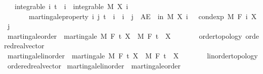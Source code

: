 \begin{isabellebody}
\ \ \ integrable{\isacharcolon}{\kern0pt}\ {\isachardoublequoteopen}{\isasymAnd}i{\isachardot}{\kern0pt}\ t\ {\isasymle}\ i\ {\isasymLongrightarrow}\ integrable\ M\ {\isacharparenleft}{\kern0pt}X\ i{\isacharparenright}{\kern0pt}{\isachardoublequoteclose}\isanewline
\ \ \ \ \ \ \ martingale{\isacharunderscore}{\kern0pt}property{\isacharcolon}{\kern0pt}\ {\isachardoublequoteopen}{\isasymAnd}i\ j{\isachardot}{\kern0pt}\ t\ {\isasymle}\ i\ {\isasymLongrightarrow}\ i\ {\isasymle}\ j\ {\isasymLongrightarrow}\ AE\ {\isasymxi}\ in\ M{\isachardot}{\kern0pt}\ X\ i\ {\isasymxi}\ {\isacharequal}{\kern0pt}\ cond{\isacharunderscore}{\kern0pt}exp\ M\ {\isacharparenleft}{\kern0pt}F\ i{\isacharparenright}{\kern0pt}\ {\isacharparenleft}{\kern0pt}X\ j{\isacharparenright}{\kern0pt}\ {\isasymxi}{\isachardoublequoteclose}\isanewline
\isanewline
{}\isamarkupfalse%
\ martingale{\isacharunderscore}{\kern0pt}order\ {\isacharequal}{\kern0pt}\ martingale\ M\ F\ t\ X\ \ M\ F\ t\ \ X\ {\isacharcolon}{\kern0pt}{\isacharcolon}{\kern0pt}\ {\isachardoublequoteopen}{\isacharunderscore}{\kern0pt}\ {\isasymRightarrow}\ {\isacharunderscore}{\kern0pt}\ {\isasymRightarrow}\ {\isacharunderscore}{\kern0pt}\ {\isacharcolon}{\kern0pt}{\isacharcolon}{\kern0pt}\ {\isacharbraceleft}{\kern0pt}order{\isacharunderscore}{\kern0pt}topology{\isacharcomma}{\kern0pt}\ ordered{\isacharunderscore}{\kern0pt}real{\isacharunderscore}{\kern0pt}vector{\isacharbraceright}{\kern0pt}{\isachardoublequoteclose}\isanewline
{}\isamarkupfalse%
\ martingale{\isacharunderscore}{\kern0pt}linorder\ {\isacharequal}{\kern0pt}\ martingale\ M\ F\ t\ X\ \ M\ F\ t\ \ X\ {\isacharcolon}{\kern0pt}{\isacharcolon}{\kern0pt}\ {\isachardoublequoteopen}{\isacharunderscore}{\kern0pt}\ {\isasymRightarrow}\ {\isacharunderscore}{\kern0pt}\ {\isasymRightarrow}\ {\isacharunderscore}{\kern0pt}\ {\isacharcolon}{\kern0pt}{\isacharcolon}{\kern0pt}\ {\isacharbraceleft}{\kern0pt}linorder{\isacharunderscore}{\kern0pt}topology{\isacharcomma}{\kern0pt}\ ordered{\isacharunderscore}{\kern0pt}real{\isacharunderscore}{\kern0pt}vector{\isacharbraceright}{\kern0pt}{\isachardoublequoteclose}\isanewline
{}\isamarkupfalse%
\ martingale{\isacharunderscore}{\kern0pt}linorder\ {\isasymsubseteq}\ martingale{\isacharunderscore}{\kern0pt}order%
\isadelimproof
\ %
\endisadelimproof

\end{isabellebody}
